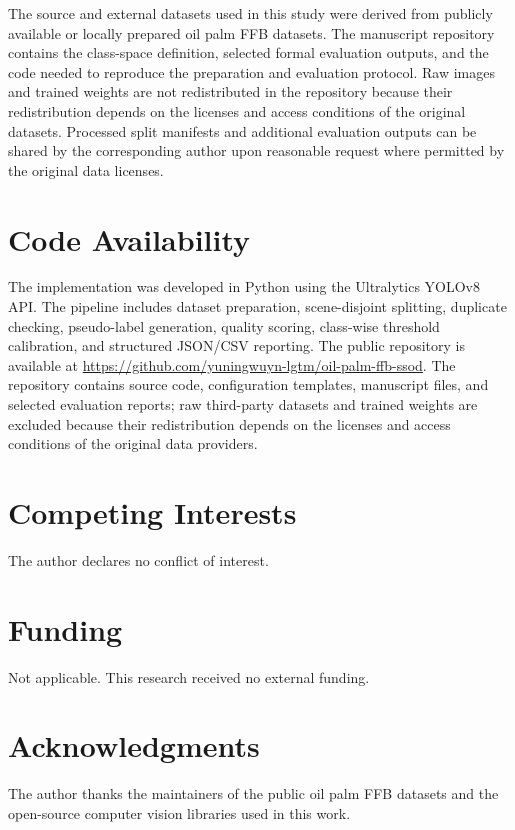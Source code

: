 ﻿\documentclass[12pt]{article}
\begin{document}
The source and external datasets used in this study were derived from publicly available or locally prepared oil palm FFB datasets. The manuscript repository contains the class-space definition, selected formal evaluation outputs, and the code needed to reproduce the preparation and evaluation protocol. Raw images and trained weights are not redistributed in the repository because their redistribution depends on the licenses and access conditions of the original datasets. Processed split manifests and additional evaluation outputs can be shared by the corresponding author upon reasonable request where permitted by the original data licenses.

\section*{Code Availability}

The implementation was developed in Python using the Ultralytics YOLOv8 API. The pipeline includes dataset preparation, scene-disjoint splitting, duplicate checking, pseudo-label generation, quality scoring, class-wise threshold calibration, and structured JSON/CSV reporting. The public repository is available at \url{https://github.com/yuningwuyn-lgtm/oil-palm-ffb-ssod}. The repository contains source code, configuration templates, manuscript files, and selected evaluation reports; raw third-party datasets and trained weights are excluded because their redistribution depends on the licenses and access conditions of the original data providers.

\section*{Competing Interests}

The author declares no conflict of interest.

\section*{Funding}

Not applicable. This research received no external funding.

\section*{Acknowledgments}

The author thanks the maintainers of the public oil palm FFB datasets and the open-source computer vision libraries used in this work.
\end{document}
